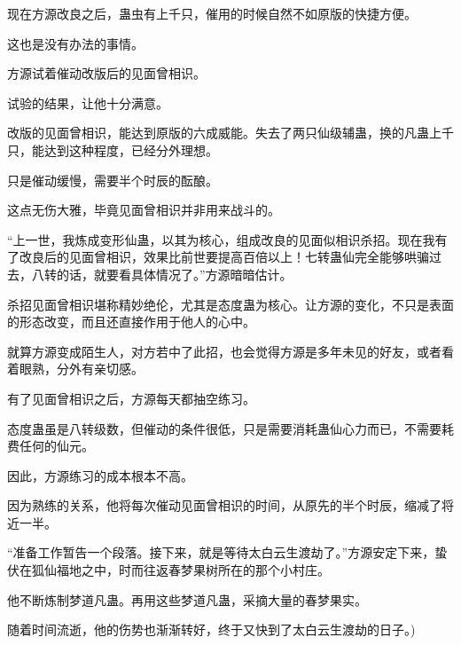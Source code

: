 \begin{this_body}
现在方源改良之后，蛊虫有上千只，催用的时候自然不如原版的快捷方便。

这也是没有办法的事情。

方源试着催动改版后的见面曾相识。

试验的结果，让他十分满意。

改版的见面曾相识，能达到原版的六成威能。失去了两只仙级辅蛊，换的凡蛊上千只，能达到这种程度，已经分外理想。

只是催动缓慢，需要半个时辰的酝酿。

这点无伤大雅，毕竟见面曾相识并非用来战斗的。

“上一世，我炼成变形仙蛊，以其为核心，组成改良的见面似相识杀招。现在我有了改良后的见面曾相识，效果比前世要提高百倍以上！七转蛊仙完全能够哄骗过去，八转的话，就要看具体情况了。”方源暗暗估计。

杀招见面曾相识堪称精妙绝伦，尤其是态度蛊为核心。让方源的变化，不只是表面的形态改变，而且还直接作用于他人的心中。

就算方源变成陌生人，对方若中了此招，也会觉得方源是多年未见的好友，或者看着眼熟，分外有亲切感。

有了见面曾相识之后，方源每天都抽空练习。

态度蛊虽是八转级数，但催动的条件很低，只是需要消耗蛊仙心力而已，不需要耗费任何的仙元。

因此，方源练习的成本根本不高。

因为熟练的关系，他将每次催动见面曾相识的时间，从原先的半个时辰，缩减了将近一半。

“准备工作暂告一个段落。接下来，就是等待太白云生渡劫了。”方源安定下来，蛰伏在狐仙福地之中，时而往返春梦果树所在的那个小村庄。

他不断炼制梦道凡蛊。再用这些梦道凡蛊，采摘大量的春梦果实。

随着时间流逝，他的伤势也渐渐转好，终于又快到了太白云生渡劫的日子。)

\end{this_body}

